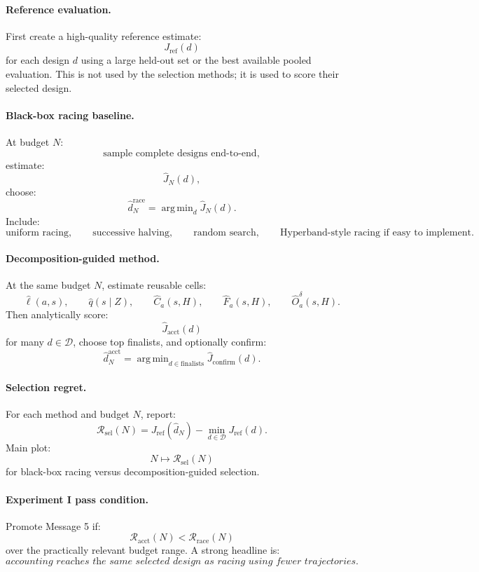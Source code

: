 \documentclass{article}
\DeclareMathOperator*{\argmin}{arg\,min}
\begin{document}
\paragraph{Reference evaluation.}
First create a high-quality reference estimate:
\[
    J_{\mathrm{ref}}(d)
\]
for each design \(d\) using a large held-out set or the best available pooled evaluation.
This is not used by the selection methods; it is used to score their selected design.

\paragraph{Black-box racing baseline.}
At budget \(N\):
\[
    \text{sample complete designs end-to-end},
\]
estimate:
\[
    \hat J_N(d),
\]
choose:
\[
    \hat d_N^{\mathrm{race}}
    =
    \argmin_d\hat J_N(d).
\]
Include:
\[
    \text{uniform racing},
    \qquad
    \text{successive halving},
    \qquad
    \text{random search},
    \qquad
    \text{Hyperband-style racing if easy to implement}.
\]

\paragraph{Decomposition-guided method.}
At the same budget \(N\), estimate reusable cells:
\[
    \hat \ell(a,s),
    \qquad
    \hat q(s\mid Z),
    \qquad
    \hat C_a(s,H),
    \qquad
    \hat F_a(s,H),
    \qquad
    \hat O_a^\delta(s,H).
\]
Then analytically score:
\[
    \hat J_{\mathrm{acct}}(d)
\]
for many \(d\in\mathcal D\), choose top finalists, and optionally confirm:
\[
    \hat d_N^{\mathrm{acct}}
    =
    \argmin_{d\in\mathrm{finalists}}\hat J_{\mathrm{confirm}}(d).
\]

\paragraph{Selection regret.}
For each method and budget \(N\), report:
\[
    \mathcal R_{\mathrm{sel}}(N)
    =
    J_{\mathrm{ref}}(\hat d_N)
    -
    \min_{d\in\mathcal D}J_{\mathrm{ref}}(d).
\]
Main plot:
\[
    N\mapsto \mathcal R_{\mathrm{sel}}(N)
\]
for black-box racing versus decomposition-guided selection.

\paragraph{Experiment I pass condition.}
Promote Message 5 if:
\[
    \mathcal R_{\mathrm{acct}}(N)
    <
    \mathcal R_{\mathrm{race}}(N)
\]
over the practically relevant budget range.
A strong headline is:
\[
    \textit{accounting reaches the same selected design as racing using fewer trajectories.}
\]
\end{document}
